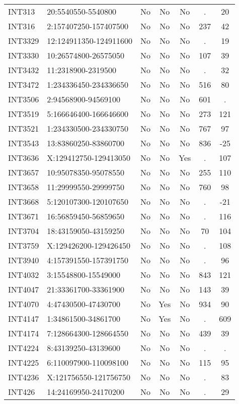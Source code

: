 \begin{longtable}{llccccc}
INT313 & 20:5540550-5540800 & No & No & No & . & 20 \\
INT316 & 2:157407250-157407500 & No & No & No & 237 & 42 \\
INT3329 & 12:124911350-124911600 & No & No & No & . & 19 \\
INT3330 & 10:26574800-26575050 & No & No & No & 107 & 39 \\
INT3432 & 11:2318900-2319500 & No & No & No & . & 32 \\
INT3472 & 1:234336450-234336650 & No & No & No & 516 & 80 \\
INT3506 & 2:94568900-94569100 & No & No & No & 601 & . \\
INT3519 & 5:166646400-166646600 & No & No & No & 273 & 121 \\
INT3521 & 1:234330500-234330750 & No & No & No & 767 & 97 \\
INT3543 & 13:83860250-83860700 & No & No & No & 836 & -25 \\
INT3636 & X:129412750-129413050 & No & No & Yes & . & 107 \\
INT3657 & 10:95078350-95078550 & No & No & No & 255 & 110 \\
INT3658 & 11:29999550-29999750 & No & No & No & 760 & 98 \\
INT3668 & 5:120107300-120107650 & No & No & No & . & -21 \\
INT3671 & 16:56859450-56859650 & No & No & No & . & 116 \\
INT3704 & 18:43159050-43159250 & No & No & No & 70 & 104 \\
INT3759 & X:129426200-129426450 & No & No & No & . & 108 \\
INT3940 & 4:157391550-157391750 & No & No & No & . & 96 \\
INT4032 & 3:15548800-15549000 & No & No & No & 843 & 121 \\
INT4047 & 21:33361700-33361900 & No & No & No & 143 & 39 \\
INT4070 & 4:47430500-47430700 & No & Yes & No & 934 & 90 \\
INT4147 & 1:34861500-34861700 & No & Yes & No & . & 609 \\
INT4174 & 7:128664300-128664550 & No & No & No & 439 & 39 \\
INT4224 & 8:43139250-43139600 & No & No & No & . & . \\
INT4225 & 6:110097900-110098100 & No & No & No & 115 & 95 \\
INT4236 & X:121756550-121756750 & No & No & No & . & 83 \\
INT426 & 14:24169950-24170200 & No & No & No & . & 29 \\

\end{longtable}
